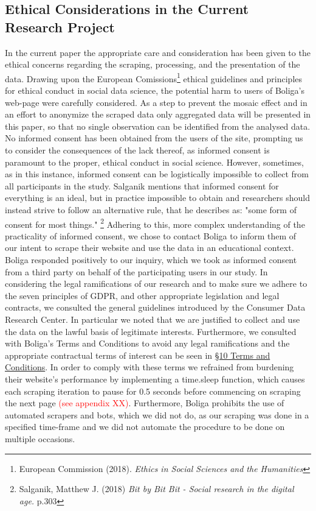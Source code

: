 \documentclass[12pt,a4paper]{article}
\begin{document}
\subsection{Ethical Considerations in the Current Research Project}
In the current paper the appropriate care and consideration has been given to the ethical concerns regarding the scraping, processing, and the presentation of the data. Drawing upon the European Comissions\footnote{European Commission (2018). \textit{Ethics in Social Sciences and the Humanities}} ethical guidelines and principles for ethical conduct in social data science, the potential harm to users of Boliga's web-page were carefully considered. As a step to prevent the mosaic effect and in an effort to anonymize the scraped data only aggregated data will be presented in this paper, so that no single observation can be identified from the analysed data.\newline
No informed consent has been obtained from the users of the site, prompting us to consider the consequences of the lack thereof, as informed consent is paramount to the proper, ethical conduct in social science. However, sometimes, as in this instance, informed consent can be logistically impossible to collect from all participants in the study. Salganik mentions that informed consent for everything is an ideal, but in practice impossible to obtain and researchers should instead strive to follow an alternative rule, that he describes as: "some form of consent for most things." \footnote{Salganik, Matthew J. (2018) \textit{Bit by Bit Bit - Social research in the digital age.} p.303} Adhering to this, more complex  understanding of the practicality of informed consent, we chose to contact Boliga to inform them of our intent to scrape their website and use the data in an educational context. Boliga responded positively to our inquiry, which we took as informed consent from a third party on behalf of the participating users in our study.\newline
In considering the legal ramifications of our research and to make sure we adhere to the seven principles of GDPR, and other appropriate legislation and legal contracts, we consulted the general guidelines introduced by the Consumer Data Research Center. In particular we noted that we are justified to collect and use the data on the lawful basis of legitimate interests. Furthermore, we consulted with Boliga's Terms and Conditions to avoid any legal ramifications and the appropriate contractual terms of interest can be seen in \href{https://www.boliga.dk/vilkaar-og-betingelser}{§10 Terms and Conditions}. In order to comply with these terms we refrained from burdening their website's performance by implementing a time.sleep function, which causes each scraping iteration to pause for 0.5 seconds before commencing on scraping the next page \textcolor{red}{(see appendix XX)}. Furthermore, Boliga prohibits the use of automated scrapers and bots, which we did not do, as our scraping was done in a specified time-frame and we did not automate the procedure to be done on multiple occasions.
\end{document}
